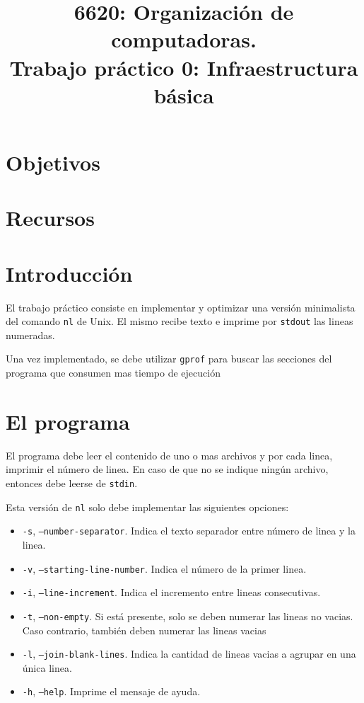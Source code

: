\documentclass[9pt,a4paper]{article}
\title{6620: Organización de computadoras.\\ Trabajo práctico 0: Infraestructura básica}
\newcommand{\stdout}{\texttt{stdout}}
\newcommand{\stdin}{\texttt{stdin}}
\newcommand{\nl}{\texttt{nl}}
\begin{document}
\maketitle
\section{Objetivos}

\section{Recursos}

\section{Introducción}
El trabajo práctico consiste en implementar y optimizar una versión minimalista
del comando \nl\cite{NL} de Unix. El mismo recibe texto e imprime por \stdout{} las 
lineas numeradas.

Una vez implementado, se debe utilizar
\texttt{gprof}\cite{GPROF} para buscar las secciones del programa que consumen
mas tiempo de ejecución

\section{El programa}
El programa debe leer el contenido de uno o mas archivos y por cada linea, imprimir el número de linea. En caso de 
que no se indique ningún archivo, entonces debe leerse de \stdin.

Esta versión de \nl{} solo debe implementar las siguientes opciones:
\begin{itemize}
\item \texttt{-s}, \texttt{--number-separator}. Indica el texto separador entre número de linea y la linea.
\item \texttt{-v}, \texttt{--starting-line-number}. Indica el número de la primer linea.
\item \texttt{-i}, \texttt{--line-increment}. Indica el incremento entre lineas consecutivas.
\item \texttt{-t}, \texttt{--non-empty}. Si está presente, solo se deben numerar las lineas no vacias. Caso contrario,
también deben numerar las lineas vacias 
\item \texttt{-l}, \texttt{--join-blank-lines}. Indica la cantidad de lineas vacias a agrupar en una única linea.
\item \texttt{-h}, \texttt{--help}. Imprime el mensaje de ayuda.
\end{itemize}
\end{document}
